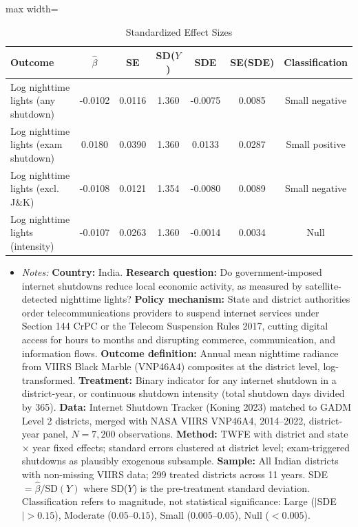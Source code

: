 \begin{table}[t]
\centering
\caption{Standardized Effect Sizes}
\label{tab:sde}
\begin{adjustbox}{max width=\textwidth}
\begin{tabular}{lcccccc}
\hline\hline
Outcome & $\hat{\beta}$ & SE & SD($Y$) & SDE & SE(SDE) & Classification \\
\hline
Log nighttime lights (any shutdown) & -0.0102 & 0.0116 & 1.360 & -0.0075 & 0.0085 & Small negative \\
Log nighttime lights (exam shutdown) & 0.0180 & 0.0390 & 1.360 & 0.0133 & 0.0287 & Small positive \\
Log nighttime lights (excl. J\&K) & -0.0108 & 0.0121 & 1.354 & -0.0080 & 0.0089 & Small negative \\
Log nighttime lights (intensity) & -0.0107 & 0.0263 & 1.360 & -0.0014 & 0.0034 & Null \\
\hline\hline
\end{tabular}
\end{adjustbox}
\par\vspace{0.3em}
{\footnotesize
\begin{itemize}[leftmargin=*,nosep]
\item \textit{Notes:} \textbf{Country:} India. \textbf{Research question:} Do government-imposed internet shutdowns reduce local economic activity, as measured by satellite-detected nighttime lights? \textbf{Policy mechanism:} State and district authorities order telecommunications providers to suspend internet services under Section 144 CrPC or the Telecom Suspension Rules 2017, cutting digital access for hours to months and disrupting commerce, communication, and information flows. \textbf{Outcome definition:} Annual mean nighttime radiance from VIIRS Black Marble (VNP46A4) composites at the district level, log-transformed. \textbf{Treatment:} Binary indicator for any internet shutdown in a district-year, or continuous shutdown intensity (total shutdown days divided by 365). \textbf{Data:} Internet Shutdown Tracker (Koning 2023) matched to GADM Level 2 districts, merged with NASA VIIRS VNP46A4, 2014--2022, district-year panel, $N = 7,200$ observations. \textbf{Method:} TWFE with district and state $\times$ year fixed effects; standard errors clustered at district level; exam-triggered shutdowns as plausibly exogenous subsample. \textbf{Sample:} All Indian districts with non-missing VIIRS data; 299 treated districts across 11 years. SDE $= \hat{\beta} / \text{SD}(Y)$ where SD($Y$) is the pre-treatment standard deviation. Classification refers to magnitude, not statistical significance: Large ($|$SDE$| > 0.15$), Moderate ($0.05$--$0.15$), Small ($0.005$--$0.05$), Null ($< 0.005$).
\end{itemize}}
\end{table}

